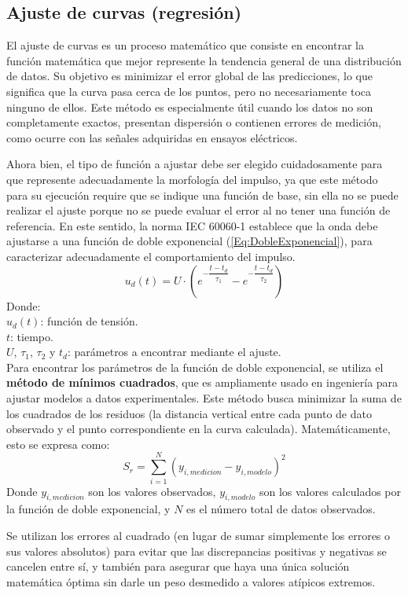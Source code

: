 \subsection{Ajuste de curvas (regresión)}
El ajuste de curvas es un proceso matemático que consiste en encontrar la función matemática que mejor represente la tendencia general de una distribución de datos. Su objetivo es minimizar el error global de las predicciones, lo que significa que la curva pasa cerca de los puntos, pero no necesariamente toca ninguno de ellos. Este método es especialmente útil cuando los datos no son completamente exactos, presentan dispersión o contienen errores de medición, como ocurre con las señales adquiridas en ensayos eléctricos.\par
Ahora bien, el tipo de función a ajustar debe ser elegido cuidadosamente para que represente adecuadamente la morfología del impulso, ya que este método para su ejecución require que se indique una función de base, sin ella no se puede realizar el ajuste porque no se puede evaluar el error al no tener una función de referencia. En este sentido, la norma IEC 60060-1 establece que la onda debe ajustarse a una función de doble exponencial (\autoref{Eq:DobleExponencial}), para caracterizar adecuadamente el comportamiento del impulso.
\begin{equation}
    u_d(t) = U \cdot \left( e^{-\dfrac{t-t_d}{\tau_1}} - e^{-\dfrac{t-t_d}{\tau_2}} \right)
    \label{Eq:DobleExponencial}
\end{equation}
Donde:\\
$u_d(t)$: función de tensión.\\
$t$: tiempo.\\
$U$, $\tau_1$, $\tau_2$ y $t_d$: parámetros a encontrar mediante el ajuste.\\


Para encontrar los parámetros de la función de doble exponencial, se utiliza el \textbf{método de mínimos cuadrados}, que es ampliamente usado en ingeniería para ajustar modelos a datos experimentales.
Este método busca minimizar la suma de los cuadrados de los residuos (la distancia vertical entre cada punto de dato observado y el punto correspondiente en la curva calculada). Matemáticamente, esto se expresa como:
\begin{equation}
    S_r = \sum_{i=1}^{N} (y_{i,medicion} - y_{i,modelo})^2
\end{equation}
Donde $y_{i,medicion}$ son los valores observados, $y_{i,modelo}$ son los valores calculados por la función de doble exponencial, y $N$ es el número total de datos observados.\par
Se utilizan los errores al cuadrado (en lugar de sumar simplemente los errores o sus valores absolutos) para evitar que las discrepancias positivas y negativas se cancelen entre sí, y también para asegurar que haya una única solución matemática óptima sin darle un peso desmedido a valores atípicos extremos.

